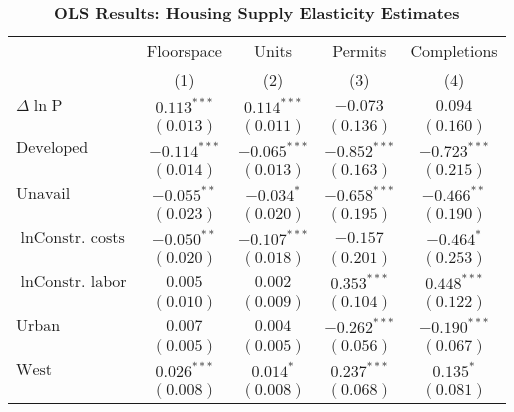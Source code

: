 
\begin{table}[H]
\caption{\textbf{OLS Results: Housing Supply Elasticity Estimates}}
\begin{center}
\begin{footnotesize}
\begin{threeparttable}
\begin{tabular}{l c c c c}
\toprule
 & \multicolumn{1}{c}{Floorspace} & \multicolumn{1}{c}{Units} & \multicolumn{1}{c}{Permits} & \multicolumn{1}{c}{Completions} \\
\cmidrule(lr){2-2} \cmidrule(lr){3-3} \cmidrule(lr){4-4} \cmidrule(lr){5-5}
 & (1) & (2) & (3) & (4) \\
\midrule
$\Delta\ln{\text{P}}$       & $0.113^{***}$  & $0.114^{***}$  & $-0.073$       & $0.094$        \\
                            & $(0.013)$      & $(0.011)$      & $(0.136)$      & $(0.160)$      \\
$\text{Developed}$          & $-0.114^{***}$ & $-0.065^{***}$ & $-0.852^{***}$ & $-0.723^{***}$ \\
                            & $(0.014)$      & $(0.013)$      & $(0.163)$      & $(0.215)$      \\
$\text{Unavail}$            & $-0.055^{**}$  & $-0.034^{*}$   & $-0.658^{***}$ & $-0.466^{**}$  \\
                            & $(0.023)$      & $(0.020)$      & $(0.195)$      & $(0.190)$      \\
$\ln{\text{Constr. costs}}$ & $-0.050^{**}$  & $-0.107^{***}$ & $-0.157$       & $-0.464^{*}$   \\
                            & $(0.020)$      & $(0.018)$      & $(0.201)$      & $(0.253)$      \\
$\ln{\text{Constr. labor}}$ & $0.005$        & $0.002$        & $0.353^{***}$  & $0.448^{***}$  \\
                            & $(0.010)$      & $(0.009)$      & $(0.104)$      & $(0.122)$      \\
$\text{Urban}$              & $0.007$        & $0.004$        & $-0.262^{***}$ & $-0.190^{***}$ \\
                            & $(0.005)$      & $(0.005)$      & $(0.056)$      & $(0.067)$      \\
$\text{West}$               & $0.026^{***}$  & $0.014^{*}$    & $0.237^{***}$  & $0.135^{*}$    \\
                            & $(0.008)$      & $(0.008)$      & $(0.068)$      & $(0.081)$      \\

\end{tabular}
\end{threeparttable}
\end{footnotesize}
\end{center}
\end{table}
